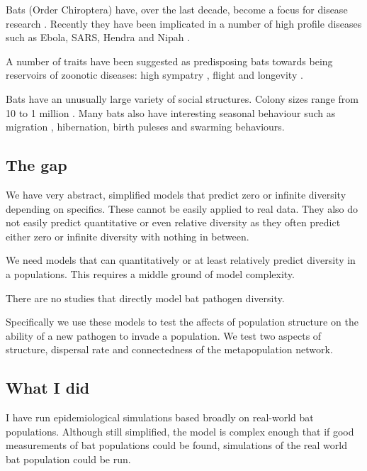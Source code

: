 Bats (Order Chiroptera) have, over the last decade, become a focus for disease research  \cite{calisher2006bats, hughes2007emerging}.
Recently they have been implicated in a number of high profile diseases such as Ebola, SARS, Hendra and Nipah  \cite{calisher2006bats, li2005bats}.

A number of traits have been suggested as predisposing bats towards being reservoirs of zoonotic diseases: high sympatry \cite{luis2013comparison}, flight \cite{wang2011mass} and longevity \cite{wang2011mass}.

Bats have an unusually large variety of social structures.
Colony sizes range from 10 to 1 million \cite{jones2009pantheria}.
Many bats also have interesting seasonal behaviour such as migration \cite{richter2008first, fleming2003ecology}, hibernation, birth puleses and swarming behaviours.


\subsection{The gap}

We have very abstract, simplified models that predict zero or infinite diversity depending on specifics.
These cannot be easily applied to real data.
They also do not easily predict quantitative or even relative diversity as they often predict either zero or infinite diversity with nothing in between.

We need models that can quantitatively or at least relatively predict diversity in a populations.
This requires a middle ground of model complexity.

There are no studies that directly model bat pathogen diversity.

Specifically we use these models to test the affects of population structure on the ability of a new pathogen to invade a population.
We test two aspects of structure, dispersal rate and connectedness of the metapopulation network.


\subsection{What I did}


I have run epidemiological simulations based broadly on real-world bat populations.
Although still simplified, the model is complex enough that if good measurements of bat populations could be found, simulations of the real world bat population could be run.

